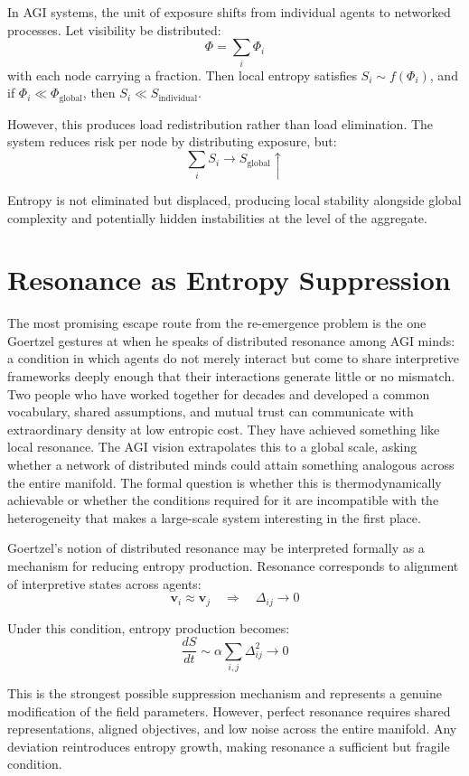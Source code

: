 \documentclass[12pt,a4paper]{article}
\begin{document}
In AGI systems, the unit of exposure shifts from individual agents to networked processes. Let visibility be distributed:
\[
\Phi = \sum_i \Phi_i
\]
with each node carrying a fraction. Then local entropy satisfies $S_i \sim f(\Phi_i)$, and if $\Phi_i \ll \Phi_{\text{global}}$, then $S_i \ll S_{\text{individual}}$.

However, this produces load redistribution rather than load elimination. The system reduces risk per node by distributing exposure, but:
\[
\sum_i S_i \rightarrow S_{\text{global}} \uparrow
\]

Entropy is not eliminated but displaced, producing local stability alongside global complexity and potentially hidden instabilities at the level of the aggregate.

\section{Resonance as Entropy Suppression}

The most promising escape route from the re-emergence problem is the one Goertzel gestures at when he speaks of distributed resonance among AGI minds: a condition in which agents do not merely interact but come to share interpretive frameworks deeply enough that their interactions generate little or no mismatch. Two people who have worked together for decades and developed a common vocabulary, shared assumptions, and mutual trust can communicate with extraordinary density at low entropic cost. They have achieved something like local resonance. The AGI vision extrapolates this to a global scale, asking whether a network of distributed minds could attain something analogous across the entire manifold. The formal question is whether this is thermodynamically achievable or whether the conditions required for it are incompatible with the heterogeneity that makes a large-scale system interesting in the first place.

Goertzel's notion of distributed resonance may be interpreted formally as a mechanism for reducing entropy production. Resonance corresponds to alignment of interpretive states across agents:
\[
\mathbf{v}_i \approx \mathbf{v}_j \quad \Rightarrow \quad \Delta_{ij} \rightarrow 0
\]

Under this condition, entropy production becomes:
\[
\frac{dS}{dt} \sim \alpha \sum_{i,j} \Delta_{ij}^2 \rightarrow 0
\]

This is the strongest possible suppression mechanism and represents a genuine modification of the field parameters. However, perfect resonance requires shared representations, aligned objectives, and low noise across the entire manifold. Any deviation reintroduces entropy growth, making resonance a sufficient but fragile condition.
\end{document}
